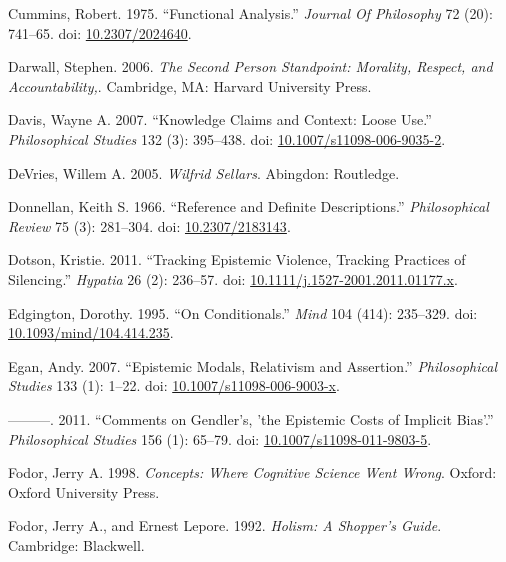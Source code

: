 \documentclass[
  10pt,
  letterpaper,
  DIV=11,
  numbers=noendperiod,
  twoside]{scrartcl}
\newlength{\cslhangindent}
\newenvironment{CSLReferences}[2] %
 {\begin{list}{}{%
  \setlength{\itemindent}{0pt}
  \setlength{\leftmargin}{0pt}
  \setlength{\parsep}{0pt}
  \ifodd #1
   \setlength{\leftmargin}{\cslhangindent}
   \setlength{\itemindent}{-1\cslhangindent}
  \fi
  \setlength{\itemsep}{#2\baselineskip}}}
 {\end{list}}
\begin{document}
\begin{CSLReferences}{1}{0}
Cummins, Robert. 1975. {``Functional Analysis.''} \emph{Journal Of
Philosophy} 72 (20): 741--65. doi:
\href{https://doi.org/10.2307/2024640}{10.2307/2024640}.

Darwall, Stephen. 2006. \emph{The Second Person Standpoint: Morality,
Respect, and Accountability,}. Cambridge, MA: Harvard University Press.

Davis, Wayne A. 2007. {``Knowledge Claims and Context: Loose Use.''}
\emph{Philosophical Studies} 132 (3): 395--438. doi:
\href{https://doi.org/10.1007/s11098-006-9035-2}{10.1007/s11098-006-9035-2}.

DeVries, Willem A. 2005. \emph{Wilfrid Sellars}. Abingdon: Routledge.

Donnellan, Keith S. 1966. {``Reference and Definite Descriptions.''}
\emph{Philosophical Review} 75 (3): 281--304. doi:
\href{https://doi.org/10.2307/2183143}{10.2307/2183143}.

Dotson, Kristie. 2011. {``Tracking Epistemic Violence, Tracking
Practices of Silencing.''} \emph{Hypatia} 26 (2): 236--57. doi:
\href{https://doi.org/10.1111/j.1527-2001.2011.01177.x}{10.1111/j.1527-2001.2011.01177.x}.

Edgington, Dorothy. 1995. {``On Conditionals.''} \emph{Mind} 104 (414):
235--329. doi:
\href{https://doi.org/10.1093/mind/104.414.235}{10.1093/mind/104.414.235}.

Egan, Andy. 2007. {``Epistemic Modals, Relativism and Assertion.''}
\emph{Philosophical Studies} 133 (1): 1--22. doi:
\href{https://doi.org/10.1007/s11098-006-9003-x}{10.1007/s11098-006-9003-x}.

---------. 2011. {``Comments on Gendler's, 'the Epistemic Costs of
Implicit Bias'.''} \emph{Philosophical Studies} 156 (1): 65--79. doi:
\href{https://doi.org/10.1007/s11098-011-9803-5}{10.1007/s11098-011-9803-5}.

Fodor, Jerry A. 1998. \emph{Concepts: Where Cognitive Science Went
Wrong}. Oxford: Oxford University Press.

Fodor, Jerry A., and Ernest Lepore. 1992. \emph{Holism: A Shopper's
Guide}. Cambridge: Blackwell.


\end{CSLReferences}
\end{document}
